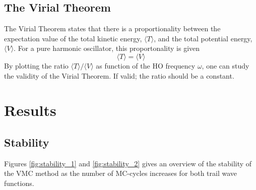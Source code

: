 \documentclass[12pt,english,a4paper]{article}
\begin{document}
\subsection{The Virial Theorem} \label{section:theory:virial}

The Virial Theorem states that there is a proportionality between the expectation value of the total kinetic energy, $\langle T\rangle$, and the total potential energy, $\langle V\rangle$. For a pure harmonic oscillator, this proportonality is given
\begin{equation}
    \langle T\rangle = \langle V\rangle
    \label{virial_theorem}
\end{equation}
By plotting the ratio $\langle T\rangle / \langle V\rangle$ as function of the HO frequency $\omega$, one can study the validity of the Virial Theorem. If valid; the ratio should be a constant.

\newpage

\section{Results} \label{section:results}

\subsection{Stability} \label{section:results:stability}

Figures \ref{fig:stability_1} and \ref{fig:stability_2} gives an overview of the stability of the VMC method as the number of MC-cycles increases for both trail wave functions.
\end{document}

